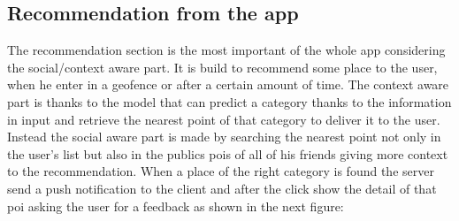 \documentclass[../../main]{subfiles}
\begin{document}
\newpage
\subsection{Recommendation from the app}
\label{ss:final-recommendation}
The recommendation section is the most important of the whole app considering the social/context aware part.
It is build to recommend some place to the user, when he enter in a geofence or after a certain amount of time.
The context aware part is thanks to the model that can predict a category thanks to the information in input and retrieve the nearest point of that category 
to deliver it to the user. Instead the social aware part is made by searching the nearest point not only in the user's list but also in the publics pois of all
of his friends giving more context to the recommendation.
When a place of the right category is found the server send a push notification to the client and after the click show the detail of that poi 
asking the user for a feedback as shown in the next figure:
\end{document}
